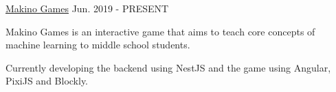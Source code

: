 
\vspace*{-1.5mm}
\begin{cventries}



  \project
  {\href{https://makino.games}{Makino Games}} %
  {Jun. 2019 - PRESENT} %
  {
    \begin{cvitems}
      \item {Makino Games is an interactive game that aims to teach core concepts of machine learning to middle school students.}
      \item {Currently developing the backend using NestJS and the game using Angular, PixiJS and Blockly.}
    \end{cvitems}
  }




\end{cventries}
